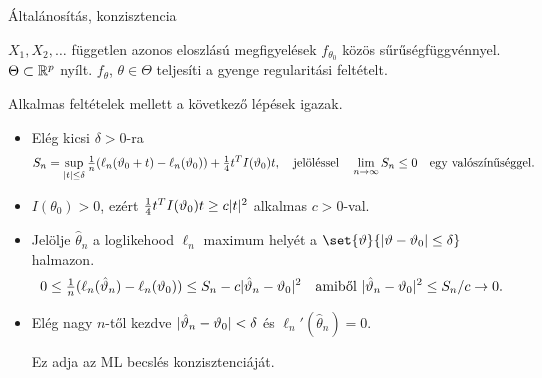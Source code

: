 \documentclass[aspectratio=169,notheorems,9pt,\option]{beamer}
\begin{document}
\begin{frame}{Általánosítás, konzisztencia}

    $X_1,X_2,\dots$ független azonos eloszlású megfigyelések $f_{\theta_0}$  közös sűrűségfüggvénnyel. 
    $\Theta\subset\mathbb{R}^p$ nyílt. $f_\theta$, $\theta\in\Theta$ teljesíti a gyenge regularitási feltételt.
  
    Alkalmas feltételek mellett a következő lépések igazak.
   \begin{itemize}
  
      \item Elég kicsi $\delta>0$-ra  
        \begin{displaymath}
          S_n = \sup_{\lvert t\rvert\leq \delta} 
          \tfrac1n(\ell_n(\vartheta_0+t)-\ell_n(\vartheta_0))+ \tfrac14 t^T I(\vartheta_0) t,
          \quad 
          \text{jelöléssel}
          \quad
          \lim_{n\to\infty} S_n\leq 0\quad\text{egy valószínűséggel.}
        \end{displaymath}
      \item $I(\theta_0)>0$, ezért $\frac14 t^T I(\vartheta_0) t \geq c\lvert t\rvert^2$ alkalmas $c>0$-val.
      \item Jelölje $\hat\theta_n$ a loglikehood $\ell_n$ maximum helyét 
      a $\set{\theta}{\abs{\theta-\theta_0}\leq\delta}$ halmazon.  
        \begin{displaymath}
          0\leq \tfrac1n\zjel{\ell_n(\hat\theta_n)-\ell_n(\theta_0)}
          \leq S_n-c\abs{\hat\theta_n-\theta_0}^2 %
          \quad\text{amiből $\abs{\hat\theta_n-\theta_0}^2\leq S_n/c\to 0$}.
        \end{displaymath}
      \item Elég nagy $n$-től kezdve $\lvert\hat{\vartheta}_n-\vartheta_0\rvert<\delta$ és $\ell_n'(\hat\theta_n)=0$.
      
      Ez adja az ML becslés konzisztenciáját.
    \end{itemize}
  \end{frame}
  
\end{document}
